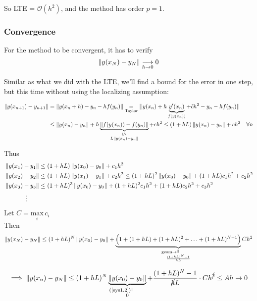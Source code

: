 So LTE = $\mathcal{O}(h^2)$, and the method has order $p=1$.

\subsubsection{Convergence}

For the method to be convergent, it has to verify $$\left\lVert y(x_N) - y_N\right\rVert \underset{h\to0}{\longrightarrow} 0$$

Similar as what we did with the LTE, we'll find a bound for the error in one step, but this time without using the localizing assumption:

\begin{align*}
    \norm{y(x_{n+1}) - y_{n+1}} &= \norm{y(x_n + h) - y_n - hf(y_n)} \underset{\text{Taylor}}{=} ||y(x_n) + h\underbrace{y'(x_n)}_{f(y(x_n))} + \Tilde{c}h^2 - y_n - hf(y_n)|| \\
    &\leq \norm{y(x_n) - y_n} + h\underbrace{\norm{f(y(x_n)) - f(y_n)}}_{\substack{\text{\rotatebox{270}{$\leq$}} \\ L\norm{y(x_n) - y_n}}} + ch^2 \leq (1+hL)\norm{y(x_n) - y_n} + ch^2 \quad \forall n
\end{align*}

Thus
\begin{align*}
    &\left\lVert y(x_1) - y_1\right\rVert \leq (1+hL)\left\lVert y(x_0) - y_0\right\rVert + c_1h^2 \\
    &\left\lVert y(x_2) - y_2\right\rVert \leq (1+hL)\left\lVert y(x_1) - y_1\right\rVert + c_2h^2 \leq (1+hL)^2\left\lVert y(x_0) - y_0\right\rVert + (1+hL)c_1h^2 + c_2h^2 \\
    &\left\lVert y(x_3) - y_3\right\rVert \leq (1+hL)^3\left\lVert y(x_0) - y_0\right\rVert + (1+hL)^2c_1h^2 + (1+hL)c_2h^2 + c_3h^2\\
    &\hspace{1.2cm}\vdots
\end{align*}
Let $C = \underset{i}{\text{max}}\,c_i$ \\

Then
\begin{align*}
    \norm{y(x_N) - y_N} \leq (1+hL)^N \norm{y(x_0) - y_0} + \underbrace{\Big(1 + (1+hL) + (1+hL)^2 + \ldots + (1+hL)^{N-1}\Big)}_{\substack{\text{\hspace{-0.94cm}geom$\to\,$\rotatebox{90}{$=$}}\\\frac{(1+hL)^N-1}{hL}}}Ch^2
\end{align*}

\[
  \implies \norm{y(x_n) - y_N} \leq (1+hL)^N\underbrace{\norm{y(x_0) - y_0}}_{\substack{\text{\hspace{-0.6cm}(\ref{sys1.2})\,\rotatebox{90}{=}}\\ 0}} + \frac{(1+hL)^N-1}{\cancel{h}L}\cdot Ch^{\cancel{2}} \leq Ah \to 0
\]

